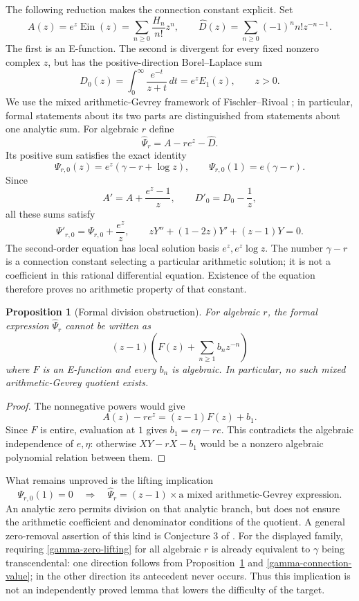 \documentclass[11pt,a4paper]{article}
\newtheorem{proposition}[theorem]{Proposition}
\theoremstyle{definition}
\theoremstyle{remark}
\numberwithin{equation}{section}
\begin{document}
The following reduction makes the connection constant explicit. Set
\[
 A(z)=e^z\operatorname{Ein}(z)=\sum_{n\ge0}\frac{H_n}{n!}z^n,
 \qquad\widehat D(z)=\sum_{n\ge0}(-1)^nn!z^{-n-1}.
\]
The first is an E-function. The second is divergent for every fixed
nonzero complex $z$, but has the positive-direction Borel--Laplace sum
\[
 D_0(z)=\int_0^\infty\frac{e^{-t}}{z+t}\,dt=e^zE_1(z),
 \qquad z>0.
\]
We use the mixed arithmetic-Gevrey framework of
Fischler--Rivoal \cite{gamma-Gevrey}; in particular, formal statements
about its two parts are distinguished from statements about one
analytic sum. For algebraic $r$ define
\[
 \widehat\Psi_r=A-re^z-\widehat D.
\]
Its positive sum satisfies the exact identity
\begin{equation}
 \Psi_{r,0}(z)=e^z(\gamma-r+\log z),\qquad
 \Psi_{r,0}(1)=e(\gamma-r).
 \label{gamma-connection-value}
\end{equation}
Since
\[
 A'=A+\frac{e^z-1}{z},\qquad D'_0=D_0-\frac1z,
\]
all these sums satisfy
\begin{equation} \Psi'_{r,0}=\Psi_{r,0}+\frac{e^z}{z},\qquad
 zY''+(1-2z)Y'+(z-1)Y=0.
 \label{gamma-second-order}
\end{equation}
The second-order equation has local solution basis $e^z,e^z\log z$.
The number $\gamma-r$ is a connection constant selecting a particular
arithmetic solution; it is not a coefficient in this rational
differential equation. Existence of the equation therefore proves no
arithmetic property of that constant.

\begin{proposition}[Formal division obstruction]
\label{gamma-division-obstruction}
For algebraic $r$, the formal expression $\widehat\Psi_r$ cannot be
written as
\[
 (z-1)\left(F(z)+\sum_{n\ge1}b_nz^{-n}\right)
\]
where $F$ is an E-function and every $b_n$ is algebraic. In particular,
no such mixed arithmetic-Gevrey quotient exists.
\end{proposition}
\begin{proof}
The nonnegative powers would give
\[
 A(z)-re^z=(z-1)F(z)+b_1.
\]
Since $F$ is entire, evaluation at $1$ gives
$b_1=e\eta-re$. This contradicts the algebraic independence of
$e,\eta$: otherwise $XY-rX-b_1$ would be a nonzero algebraic
polynomial relation between them.
\end{proof}

What remains unproved is the lifting implication
\begin{equation}
 \Psi_{r,0}(1)=0\quad\Longrightarrow\quad
 \widehat\Psi_r=(z-1)\times
 \text{a mixed arithmetic-Gevrey expression}.
 \label{gamma-zero-lifting}
\end{equation}
An analytic zero permits division on that analytic branch, but does
not ensure the arithmetic coefficient and denominator conditions of
the quotient. A general zero-removal assertion of this kind is
Conjecture 3 of \cite{gamma-Gevrey}. For the displayed family,
requiring \eqref{gamma-zero-lifting} for all algebraic $r$ is already
equivalent to $\gamma$ being transcendental: one direction follows
from Proposition~\ref{gamma-division-obstruction} and
\eqref{gamma-connection-value}; in the other direction its antecedent
never occurs. Thus this implication is not an independently proved
lemma that lowers the difficulty of the target.
\end{document}
